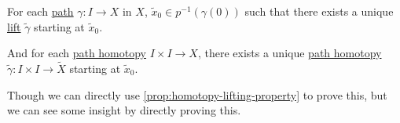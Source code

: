 \begin{corollary}\label{col:path-lifting-property}
	For each \hyperref[def:path]{path} \(\gamma \colon I\to X\) in \(X\), \(\widetilde{x} _0\in p^{-1} (\gamma (0)) \) such that there exists a
	unique \hyperref[prop:homotopy-lifting-property]{lift} \(\widetilde{\gamma} \) starting at \(\widetilde{x} _0\).

	\par And for each \hyperref[def:homotopy-path]{path homotopy} \(I\times I\to X\), there exists a unique \hyperref[def:homotopy-path]{path homotopy}
	\(\widetilde{\gamma} \colon I\times I\to \widetilde{X} \) starting at \(\widetilde{x}_0\).
	\begin{figure}[H]
		\centering
		\label{fig:col:lec14:1}
	\end{figure}
\end{corollary}
Though we can directly use \autoref{prop:homotopy-lifting-property} to prove this, but we can see some insight by directly proving this.

